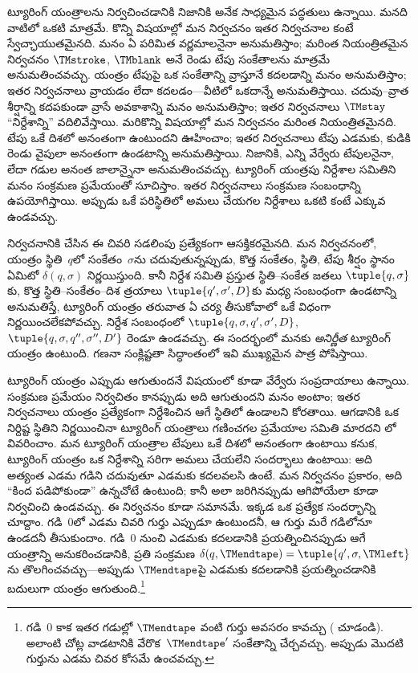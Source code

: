 \documentclass[../../../include/open-logic-section]{subfiles}
\begin{document}

ట్యూరింగ్ యంత్రాలను నిర్వచించడానికి నిజానికి అనేక సాధ్యమైన పద్ధతులు ఉన్నాయి.
మనది వాటిలో ఒకటి మాత్రమే. కొన్ని విషయాల్లో మన నిర్వచనం ఇతర నిర్వచనాల కంటే
స్వేచ్ఛాయుతమైనది. మనం ఏ పరిమిత వర్ణమాలనైనా అనుమతిస్తాం; మరింత నియంత్రితమైన
నిర్వచనం $\TMstroke$, $\TMblank$ అనే రెండు టేపు సంకేతాలను మాత్రమే అనుమతించవచ్చు.
యంత్రం టేపుపై ఒక సంకేతాన్ని వ్రాస్తూనే కదలడాన్ని మనం అనుమతిస్తాం; ఇతర
నిర్వచనాలు వ్రాయడం లేదా కదలడం---వీటిలో ఒకదాన్నే అనుమతిస్తాయి. చదువు--వ్రాత శీర్షాన్ని
కదపకుండా వ్రాసే అవకాశాన్ని మనం అనుమతిస్తాం; ఇతర నిర్వచనాలు $\TMstay$
``నిర్దేశాన్ని'' వదిలివేస్తాయి. మరికొన్ని విషయాల్లో మన నిర్వచనం మరింత
నియంత్రితమైనది. టేపు ఒకే దిశలో అనంతంగా ఉంటుందని ఊహించాం; ఇతర నిర్వచనాలు
టేపు ఎడమకు, కుడికి రెండు వైపులా అనంతంగా ఉండటాన్ని అనుమతిస్తాయి. నిజానికి,
ఎన్ని వేర్వేరు టేపులనైనా, లేదా గడుల అనంత జాలాన్నైనా అనుమతించవచ్చు. ట్యూరింగ్
యంత్రపు నిర్దేశాల సమితిని మనం సంక్రమణ ప్రమేయంతో సూచిస్తాం. ఇతర
నిర్వచనాలు సంక్రమణ సంబంధాన్ని ఉపయోగిస్తాయి. అప్పుడు ఒకే పరిస్థితిలో
అమలు చేయగల నిర్దేశాలు ఒకటి కంటే ఎక్కువ ఉండవచ్చు.

నిర్వచనానికి చేసిన ఈ చివరి సడలింపు ప్రత్యేకంగా ఆసక్తికరమైనది. మన నిర్వచనంలో,
యంత్రం స్థితి~$q$లో సంకేతం~$\sigma$ను చదువుతున్నప్పుడు, కొత్త సంకేతం, స్థితి,
టేపు శీర్షం స్థానం ఏమిటో $\delta(q, \sigma)$ నిర్ణయిస్తుంది. కానీ నిర్దేశ
సమితి ప్రస్తుత స్థితి--సంకేత జతలు $\tuple{q, \sigma}$కు, కొత్త
స్థితి--సంకేతం--దిశ త్రయాలు $\tuple{q', \sigma', D}$కు మధ్య సంబంధంగా ఉండటాన్ని
అనుమతిస్తే, ట్యూరింగ్ యంత్రం తరువాత ఏ చర్య తీసుకోవాలో ఒకే విధంగా నిర్ణయించలేకపోవచ్చు. నిర్దేశ
సంబంధంలో $\tuple{q, \sigma, q', \sigma', D}$,
$\tuple{q, \sigma, q'', \sigma'', D'}$ రెండూ ఉండవచ్చు. ఈ సందర్భంలో మనకు
\emph{అనిర్ణీత} ట్యూరింగ్ యంత్రం ఉంటుంది. గణనా సంక్లిష్టతా సిద్ధాంతంలో ఇవి
ముఖ్యమైన పాత్ర పోషిస్తాయి.

ట్యూరింగ్ యంత్రం ఎప్పుడు ఆగుతుందనే విషయంలో కూడా వేర్వేరు సంప్రదాయాలు ఉన్నాయి.
సంక్రమణ ప్రమేయం నిర్వచితం కానప్పుడు అది ఆగుతుందని మనం అంటాం; ఇతర నిర్వచనాలు
యంత్రం ప్రత్యేకంగా నిర్దేశించిన ఆగే స్థితిలో ఉండాలని కోరతాయి. ఆగడానికి ఒక నిర్దిష్ట స్థితిని నిర్ణయించినా ట్యూరింగ్ యంత్రాలు గణించగల
ప్రమేయాల సమితి మారదని
లో వివరించాం. మన ట్యూరింగ్ యంత్రాల టేపులు ఒకే దిశలో అనంతంగా
ఉంటాయి కనుక, ట్యూరింగ్ యంత్రం ఒక నిర్దేశాన్ని సరిగా అమలు చేయలేని సందర్భాలు
ఉంటాయి: అది అత్యంత ఎడమ గడిని చదువుతూ ఎడమకు కదలవలసి ఉంటే. మన నిర్వచనం
ప్రకారం, అది ``కింద పడిపోకుండా'' ఉన్నచోటే ఉంటుంది; కానీ అలా జరిగినప్పుడు
ఆగిపోయేలా కూడా నిర్వచించి ఉండవచ్చు. ఈ నిర్వచనం కూడా సమానమే. ఇక్కడ
ఒక ప్రత్యేక సందర్భాన్ని చూద్దాం. గడి~$0$లో ఎడమ చివరి గుర్తు ఎప్పుడూ
ఉంటుందనీ, ఆ గుర్తు మరే గడిలోనూ ఉండదనీ తీసుకుందాం. గడి~$0$ నుంచి
ఎడమకు కదలడానికి ప్రయత్నించినప్పుడు ఆగే యంత్రాన్ని అనుకరించడానికి,
ప్రతి సంక్రమణ $\delta(q,\TMendtape) =
\tuple{q',\sigma,\TMleft}$ను తొలగించవచ్చు---అప్పుడు $\TMendtape$పై ఎడమకు
కదలడానికి ప్రయత్నించడానికి బదులుగా యంత్రం ఆగుతుంది.\footnote{గడి~$0$ కాక
ఇతర గడుల్లో $\TMendtape$ వంటి గుర్తు అవసరం కావచ్చు (
చూడండి). అలాంటి చోట్ల వాడటానికి వేరొక~$\TMendtape'$ సంకేతాన్ని చేర్చవచ్చు.
అప్పుడు మొదటి గుర్తును ఎడమ చివర కోసమే ఉంచవచ్చు.}
\end{document}
